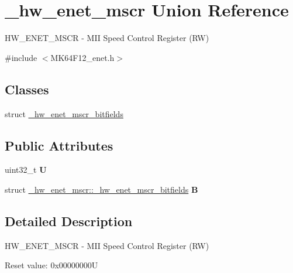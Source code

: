 \hypertarget{union__hw__enet__mscr}{}\section{\+\_\+hw\+\_\+enet\+\_\+mscr Union Reference}
\label{union__hw__enet__mscr}


H\+W\+\_\+\+E\+N\+E\+T\+\_\+\+M\+S\+CR -\/ M\+II Speed Control Register (RW)  




{\ttfamily \#include $<$M\+K64\+F12\+\_\+enet.\+h$>$}

\subsection*{Classes}
\begin{DoxyCompactItemize}
\item 
struct \hyperlink{struct__hw__enet__mscr_1_1__hw__enet__mscr__bitfields}{\+\_\+hw\+\_\+enet\+\_\+mscr\+\_\+bitfields}
\end{DoxyCompactItemize}
\subsection*{Public Attributes}
\begin{DoxyCompactItemize}
\item 
uint32\+\_\+t {\bfseries U}\hypertarget{union__hw__enet__mscr_a8457fbb28a757e8c81564b5dbbebab12}{}\label{union__hw__enet__mscr_a8457fbb28a757e8c81564b5dbbebab12}

\item 
struct \hyperlink{struct__hw__enet__mscr_1_1__hw__enet__mscr__bitfields}{\+\_\+hw\+\_\+enet\+\_\+mscr\+::\+\_\+hw\+\_\+enet\+\_\+mscr\+\_\+bitfields} {\bfseries B}\hypertarget{union__hw__enet__mscr_ab6aff4c45c2473671bca5da4f091656c}{}\label{union__hw__enet__mscr_ab6aff4c45c2473671bca5da4f091656c}

\end{DoxyCompactItemize}


\subsection{Detailed Description}
H\+W\+\_\+\+E\+N\+E\+T\+\_\+\+M\+S\+CR -\/ M\+II Speed Control Register (RW) 

Reset value\+: 0x00000000U

